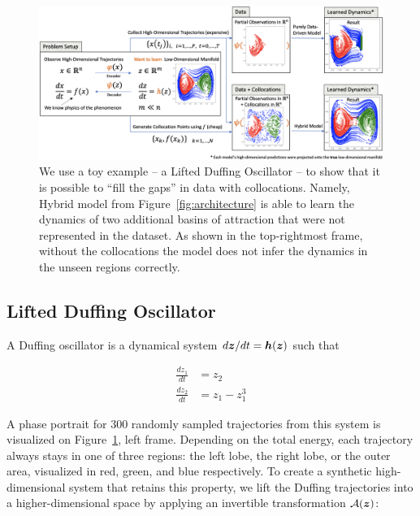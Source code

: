 \begin{figure}[t]
    \centering
    \includegraphics[width=\textwidth]{figures/duff_first_exp_abstract.png}
    \caption{We use a toy example -- a Lifted Duffing Oscillator -- to show that it is possible to ``fill the gaps'' in data with collocations. Namely, Hybrid model from Figure~\ref{fig:architecture} is able to learn the dynamics of two additional basins of attraction that were not represented in the dataset. As shown in the top-rightmost frame, without the collocations the model does not infer the dynamics in the unseen regions correctly.}
    \label{fig:duffing_pinode}
\end{figure}

\newpage
\subsection{Lifted Duffing Oscillator}
\label{sec:duffing}

A Duffing oscillator is a dynamical system $d\boldsymbol{z}/dt = \boldsymbol{h}(\boldsymbol{z})$ such that 

\begin{equation}
    \label{eq:duffing_definition}
    \begin{split}
    \frac{dz_1}{dt} & = z_2 \\ 
    \frac{dz_2}{dt} & = z_1 - z_1^3
    \end{split}
\end{equation}


A phase portrait for 300 randomly sampled trajectories from this system is visualized on Figure~\ref{fig:duffing_pinode}, left frame. Depending on the total energy, each trajectory always stays in one of three regions: the left lobe, the right lobe, or the outer area, visualized in red, green, and blue respectively. To create a synthetic high-dimensional system that retains this property, we lift the Duffing trajectories into a higher-dimensional space by applying an invertible transformation $\mathcal{A}(\boldsymbol{z})$: 

